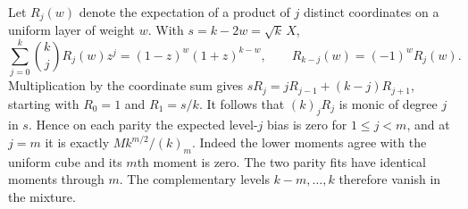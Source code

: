 \documentclass[11pt,letterpaper]{article}
\theoremstyle{research}
\begin{document}
Let $R_j(w)$ denote the expectation of a product of $j$ distinct coordinates
on a uniform layer of weight $w$. With $s=k-2w=\sqrt k\,X$,
\begin{equation}\label{eq:K}
 \sum_{j=0}^k\binom{k}{j}R_j(w)z^j=(1-z)^w(1+z)^{k-w},\qquad
 R_{k-j}(w)=(-1)^w R_j(w).
\end{equation}
Multiplication by the coordinate sum gives
$s R_j=jR_{j-1}+(k-j)R_{j+1}$, starting with $R_0=1$ and $R_1=s/k$.
It follows that $(k)_jR_j$ is monic of degree $j$ in $s$. Hence on each parity
the expected level-$j$ bias is zero for $1\le j<m$, and at $j=m$ it is exactly
$M k^{m/2}/(k)_m$. Indeed the lower moments agree with the uniform cube
and its $m$th moment is zero. The two parity fits have identical moments
through $m$. The complementary levels $k-m,\ldots,k$ therefore vanish in the mixture.
\end{document}
